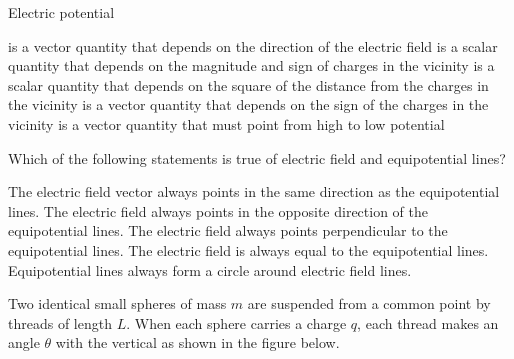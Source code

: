\documentclass{../../../oss-ap12ibhl-print}
\begin{document}
\begin{questions}
  \question Electric potential
  \begin{choices}
    \choice is a vector quantity that depends on the direction of the electric
    field
    \choice is a scalar quantity that depends on the magnitude and sign of
    charges in the vicinity
    \choice is a scalar quantity that depends on the square of the distance from
    the charges in the vicinity
    \choice is a vector quantity that depends on the sign of the charges in the
    vicinity
    \choice is a vector quantity that must point from high to low potential
  \end{choices}

  \question Which of the following statements is true of electric field and
  equipotential lines?
  \begin{choices}
    \choice The electric field vector always points in the same direction as the
    equipotential lines.
    \choice The electric field always points in the opposite direction of the
    equipotential lines.
    \choice The electric field always points perpendicular to the equipotential
    lines.
    \choice The electric field is always equal to the equipotential lines.
    \choice Equipotential lines always form a circle around electric field
    lines.
  \end{choices}

  \question Two identical small spheres of mass $m$ are suspended from a common
  point by threads of length $L$. When each sphere carries a charge $q$, each
  thread makes an angle $\theta$ with the vertical as shown in the figure below.
  \begin{parts}

\end{parts}
\end{questions}
\end{document}
